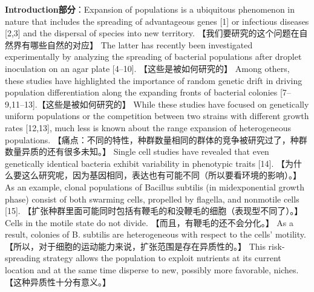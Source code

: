 \textbf{Introduction部分}：Expansion of populations is a ubiquitous phenomenon in nature that includes the spreading of advantageous genes [1] or infectious diseases [2,3] and the dispersal of species into new territory. 【我们要研究的这个问题在自然界有哪些自然的对应】 The latter has recently been investigated experimentally by analyzing the spreading of bacterial populations after droplet inoculation on an agar plate [4–10]. 【这些是被如何研究的】 Among others, these studies have highlighted the importance of random genetic drift in driving population differentiation along the expanding fronts of bacterial colonies [7–9,11–13].【这些是被如何研究的】 While these studies have focused on genetically uniform populations or the competition between two strains with different growth rates [12,13], much less is known about the range expansion of heterogeneous populations. 【痛点：不同的特性，种群数量相同的群体的竞争被研究过了，种群数量异质的还有很多未知。】 Single cell studies have revealed that even genetically identical bacteria exhibit variability in phenotypic traits [14]. 【为什么要这么研究呢，因为基因相同，表达也有可能不同（所以要看环境的影响）。】 As an example, clonal populations of Bacillus subtilis (in midexponential growth phase) consist of both swarming cells, propelled by flagella, and nonmotile cells [15]. 【扩张种群里面可能同时包括有鞭毛的和没鞭毛的细胞（表现型不同了）。】 Cells in the motile state do not divide. 【而且，有鞭毛的还不会分化。】 As a result, colonies of B. subtilis are heterogeneous with respect to the cells’ motility. 【所以，对于细胞的运动能力来说，扩张范围是存在异质性的。】 This risk-spreading strategy allows the population to exploit nutrients at its current location and at the same time disperse to new, possibly more favorable, niches. 【这种异质性十分有意义。】

